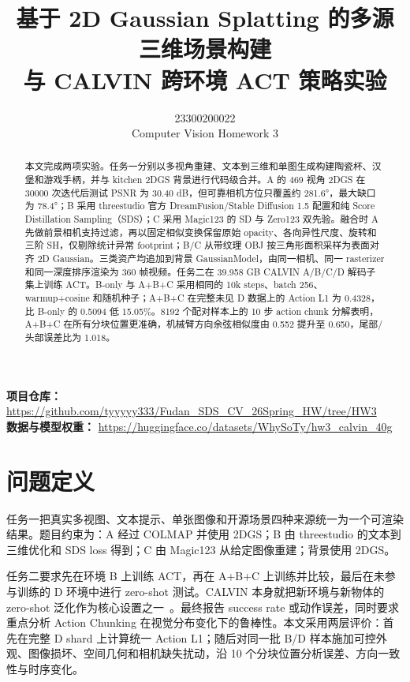 \documentclass[letterpaper,times,10pt,twocolumn]{article}
\begin{document}
\title{基于 2D Gaussian Splatting 的多源三维场景构建\\
与 CALVIN 跨环境 ACT 策略实验}

\author{23300200022\\
Computer Vision Homework 3}

\maketitle

\noindent\textbf{项目仓库：} \url{https://github.com/tyyyyy333/Fudan_SDS_CV_26Spring_HW/tree/HW3}\\
\textbf{数据与模型权重：} \url{https://huggingface.co/datasets/WhySoTy/hw3_calvin_40g}

\begin{abstract}
本文完成两项实验。任务一分别以多视角重建、文本到三维和单图生成构建陶瓷杯、汉堡和游戏手柄，并与 kitchen 2DGS 背景进行代码级合并。A 的 469 视角 2DGS 在 30000 次迭代后测试 PSNR 为 30.40 dB，但可靠相机方位只覆盖约 281.6°，最大缺口为 78.4°；B 采用 threestudio 官方 DreamFusion/Stable Diffusion 1.5 配置和纯 Score Distillation Sampling（SDS）；C 采用 Magic123 的 SD 与 Zero123 双先验。融合时 A 先做前景相机支持过滤，再以固定相似变换保留原始 opacity、各向异性尺度、旋转和三阶 SH，仅剔除统计异常 footprint；B/C 从带纹理 OBJ 按三角形面积采样为表面对齐 2D Gaussian。三类资产均追加到背景 GaussianModel，由同一相机、同一 rasterizer 和同一深度排序渲染为 360 帧视频。任务二在 39.958 GB CALVIN A/B/C/D 解码子集上训练 ACT。B-only 与 A+B+C 采用相同的 10k steps、batch 256、warmup+cosine 和随机种子；A+B+C 在完整未见 D 数据上的 Action L1 为 0.4328，比 B-only 的 0.5094 低 15.05\%。8192 个配对样本上的 10 步 action chunk 分解表明，A+B+C 在所有分块位置更准确，机械臂方向余弦相似度由 0.552 提升至 0.650，尾部/头部误差比为 1.018。
\end{abstract}

\section{问题定义}

任务一把真实多视图、文本提示、单张图像和开源场景四种来源统一为一个可渲染结果。题目约束为：A 经过 COLMAP 并使用 2DGS；B 由 threestudio 的文本到三维优化和 SDS loss 得到；C 由 Magic123 从给定图像重建；背景使用 2DGS。

任务二要求先在环境 B 上训练 ACT，再在 A+B+C 上训练并比较，最后在未参与训练的 D 环境中进行 zero-shot 测试。CALVIN 本身就把新环境与新物体的 zero-shot 泛化作为核心设置之一~\cite{mees2022calvin}。最终报告 success rate 或动作误差，同时要求重点分析 Action Chunking 在视觉分布变化下的鲁棒性。本文采用两层评价：首先在完整 D shard 上计算统一 Action L1；随后对同一批 B/D 样本施加可控外观、图像损坏、空间几何和相机缺失扰动，沿 10 个分块位置分析误差、方向一致性与时序变化。
\end{document}
